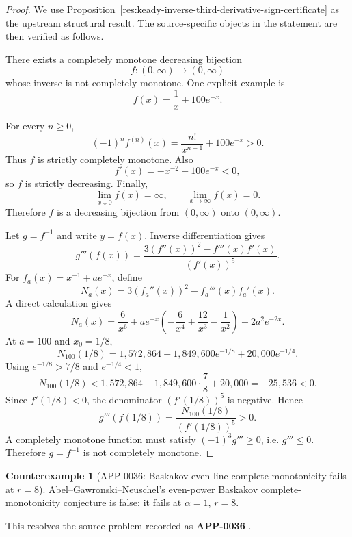 \documentclass[11pt]{article}
\numberwithin{equation}{section}
\theoremstyle{definition}
\newtheorem{counterexample}[theorem]{Counterexample}
\theoremstyle{remark}
\newcommand{\1}{\mathbf 1}
\begin{document}
\begin{proof}
We use Proposition~\ref{res:keady-inverse-third-derivative-sign-certificate} as the upstream structural result. The source-specific objects in the statement are then verified as follows.

There exists a completely monotone decreasing bijection
\[
f:(0,\infty)\to(0,\infty)
\]
whose inverse is not completely monotone. One explicit example is
\[
f(x)=\frac1x+100e^{-x}.
\]

For every \(n\ge0\),
\[
(-1)^n f^{(n)}(x)=\frac{n!}{x^{n+1}}+100e^{-x}>0.
\]
Thus \(f\) is strictly completely monotone. Also
\[
f'(x)=-x^{-2}-100e^{-x}<0,
\]
so \(f\) is strictly decreasing. Finally,
\[
\lim_{x\downarrow0}f(x)=\infty,
\qquad
\lim_{x\to\infty}f(x)=0.
\]
Therefore \(f\) is a decreasing bijection from \((0,\infty)\) onto \((0,\infty)\).

Let \(g=f^{-1}\) and write \(y=f(x)\). Inverse differentiation gives
\[
g'''(f(x))=\frac{3(f''(x))^2-f'''(x)f'(x)}{(f'(x))^5}.
\]
For \(f_a(x)=x^{-1}+ae^{-x}\), define
\[
N_a(x)=3(f_a''(x))^2-f_a'''(x)f_a'(x).
\]
A direct calculation gives
\[
N_a(x)=\frac6{x^6}+ae^{-x}\left(-\frac6{x^4}+\frac{12}{x^3}-\frac1{x^2}\right)+2a^2e^{-2x}.
\]
At \(a=100\) and \(x_0=1/8\),
\[
N_{100}(1/8)=1{,}572{,}864-1{,}849{,}600e^{-1/8}+20{,}000e^{-1/4}.
\]
Using \(e^{-1/8}>7/8\) and \(e^{-1/4}<1\),
\[
N_{100}(1/8)<1{,}572{,}864-1{,}849{,}600\cdot\frac78+20{,}000=-25{,}536<0.
\]
Since \(f'(1/8)<0\), the denominator \((f'(1/8))^5\) is negative. Hence
\[
g'''(f(1/8))=\frac{N_{100}(1/8)}{(f'(1/8))^5}>0.
\]
A completely monotone function must satisfy \((-1)^3g'''\ge0\), i.e. \(g'''\le0\). Therefore \(g=f^{-1}\) is not completely monotone.
\end{proof}

\begin{counterexample}[APP-0036: Baskakov even-line complete-monotonicity fails at \(r=8\)]
\label{res:not-baskakov-higher-power-even-conjecture}
Abel--Gawronski--Neuschel's even-power Baskakov complete-monotonicity conjecture is false; it fails at \(\alpha=1\), \(r=8\).



This resolves the source problem recorded as \textbf{APP-0036} \cite{abel-gawronski-neuschel}.
\end{counterexample}
\end{document}
